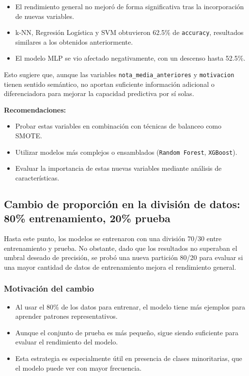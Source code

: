 \documentclass[11pt,a4paper]{article}
\begin{document}
\begin{itemize}
    \item El rendimiento general no mejoró de forma significativa tras la incorporación de nuevas variables.
    \item k-NN, Regresión Logística y SVM obtuvieron 62.5\% de \texttt{accuracy}, resultados similares a los obtenidos anteriormente.
    \item El modelo MLP se vio afectado negativamente, con un descenso hasta 52.5\%.
\end{itemize}

Esto sugiere que, aunque las variables \texttt{nota\_media\_anteriores} y \texttt{motivacion} tienen sentido semántico, no aportan suficiente información adicional o diferenciadora para mejorar la capacidad predictiva por sí solas.

\textbf{Recomendaciones:}
\begin{itemize}
    \item Probar estas variables en combinación con técnicas de balanceo como SMOTE.
    \item Utilizar modelos más complejos o ensamblados (\texttt{Random Forest}, \texttt{XGBoost}).
    \item Evaluar la importancia de estas nuevas variables mediante análisis de características.
\end{itemize}

\subsection{Cambio de proporción en la división de datos: 80\% entrenamiento, 20\% prueba}

Hasta este punto, los modelos se entrenaron con una división 70/30 entre entrenamiento y prueba. No obstante, dado que los resultados no superaban el umbral deseado de precisión, se probó una nueva partición 80/20 para evaluar si una mayor cantidad de datos de entrenamiento mejora el rendimiento general.

\subsubsection*{Motivación del cambio}
\begin{itemize}
    \item Al usar el 80\% de los datos para entrenar, el modelo tiene más ejemplos para aprender patrones representativos.
    \item Aunque el conjunto de prueba es más pequeño, sigue siendo suficiente para evaluar el rendimiento del modelo.
    \item Esta estrategia es especialmente útil en presencia de clases minoritarias, que el modelo puede ver con mayor frecuencia.
\end{itemize}
\end{document}
